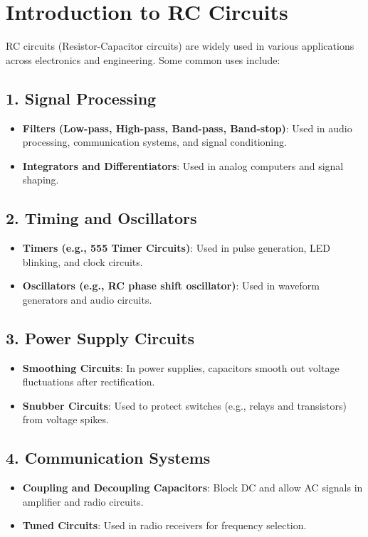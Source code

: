 \documentclass[a4paper,12pt]{article}
\begin{document}
\section{Introduction to RC Circuits}
RC circuits (Resistor-Capacitor circuits) are widely used in various applications across electronics and engineering. Some common uses include:

\subsection{1. Signal Processing}
\begin{itemize}
    \item \textbf{Filters (Low-pass, High-pass, Band-pass, Band-stop)}: Used in audio processing, communication systems, and signal conditioning.
    \item \textbf{Integrators and Differentiators}: Used in analog computers and signal shaping.
\end{itemize}

\subsection{2. Timing and Oscillators}
\begin{itemize}
    \item \textbf{Timers (e.g., 555 Timer Circuits)}: Used in pulse generation, LED blinking, and clock circuits.
    \item \textbf{Oscillators (e.g., RC phase shift oscillator)}: Used in waveform generators and audio circuits.
\end{itemize}

\subsection{3. Power Supply Circuits}
\begin{itemize}
    \item \textbf{Smoothing Circuits}: In power supplies, capacitors smooth out voltage fluctuations after rectification.
    \item \textbf{Snubber Circuits}: Used to protect switches (e.g., relays and transistors) from voltage spikes.
\end{itemize}

\subsection{4. Communication Systems}
\begin{itemize}
    \item \textbf{Coupling and Decoupling Capacitors}: Block DC and allow AC signals in amplifier and radio circuits.
    \item \textbf{Tuned Circuits}: Used in radio receivers for frequency selection.
\end{itemize}
\end{document}
